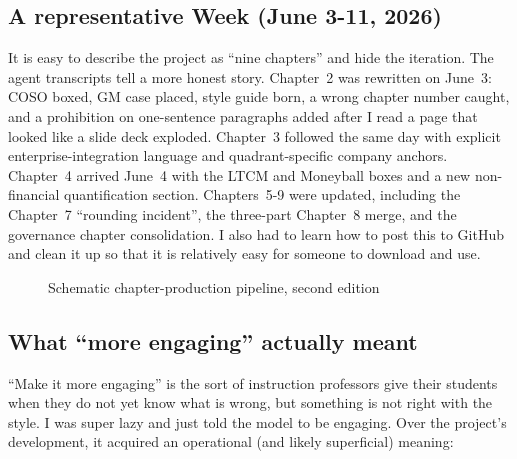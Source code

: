 \documentclass[11pt,letterpaper]{article}
\begin{document}
\subsection{A representative Week (June 3-11, 2026)}

It is easy to describe the project as ``nine chapters'' and hide the iteration. The agent transcripts tell a more honest story. Chapter~2 was rewritten on June~3: COSO boxed, GM case placed, style guide born, a wrong chapter number caught, and a prohibition on one-sentence paragraphs added after I read a page that looked like a slide deck exploded. Chapter~3 followed the same day with explicit enterprise-integration language and quadrant-specific company anchors. Chapter~4 arrived June~4 with the LTCM and Moneyball boxes and a new non-financial quantification section. Chapters~5-9 were updated, including the Chapter~7 ``rounding incident'', the three-part Chapter~8 merge, and the governance chapter consolidation. I also had to learn how to post this to GitHub and clean it up so that it is relatively easy for someone to download and use. 

\begin{figure}[htbp]
  \centering
  \caption{Schematic chapter-production pipeline, second edition}
  \label{fig:chapter-workflow}
\end{figure}

\subsection{What ``more engaging'' actually meant}

``Make it more engaging'' is the sort of instruction professors give their students when they do not yet know what is wrong, but something is not right with the style. I was super lazy and just told the model to be engaging. Over the project's development, it acquired an operational (and likely superficial)  meaning:
\end{document}
